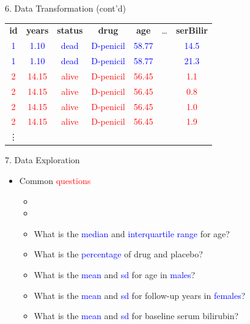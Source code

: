 \documentclass[14pt, aspectratio=169, sectionpage=simple, xclolor=table]{beamer}
\begin{document}
\begin{frame}[fragile]{6. Data Transformation (cont'd)}
\begin{tabular}{ccccccc}
	\textbf{id} &  \textbf{years} &  \textbf{status}  &  \textbf{drug} &  \textbf{age} & \dots &  \textbf{serBilir} \\
	\textcolor{blue}{1}& \textcolor{blue}{1.10} & \textcolor{blue}{dead}&  \textcolor{blue}{ D-penicil} & \textcolor{blue}{58.77} & & \textcolor{blue}{14.5} \\
	\textcolor{blue}{1}& \textcolor{blue}{1.10} & \textcolor{blue}{dead}&  \textcolor{blue}{ D-penicil} & \textcolor{blue}{58.77} & & \textcolor{blue}{21.3} \\
	\textcolor{red}{2}& \textcolor{red}{14.15}& \textcolor{red}{alive}& \textcolor{red}{D-penicil} & \textcolor{red}{56.45} & & \textcolor{red}{1.1}\\
	\textcolor{red}{2}& \textcolor{red}{14.15}& \textcolor{red}{alive}& \textcolor{red}{D-penicil} & \textcolor{red}{56.45} & & \textcolor{red}{0.8}\\
	\textcolor{red}{2}& \textcolor{red}{14.15}& \textcolor{red}{alive}& \textcolor{red}{D-penicil} & \textcolor{red}{56.45} & & \textcolor{red}{1.0}\\
	\textcolor{red}{2}& \textcolor{red}{14.15}& \textcolor{red}{alive}& \textcolor{red}{D-penicil} & \textcolor{red}{56.45} & & \textcolor{red}{1.9}\\
	\vdots &&&&&&
\end{tabular}
\end{frame}
\begin{frame}[fragile]{7. Data Exploration}
\begin{itemize}
\item Common \textcolor{red}{questions}
\vspace{1ex}
\begin{itemize}
	\item {}
	\item {}
  \item What is the \textcolor{blue}{median} and \textcolor{blue}{interquartile range} for age?
 	\item What is the \textcolor{blue}{percentage} of drug and placebo?
	\item What is the \textcolor{blue}{mean} and \textcolor{blue}{sd} for age in \textcolor{blue}{males}?
  \item What is the \textcolor{blue}{mean} and \textcolor{blue}{sd} for follow-up years in \textcolor{blue}{females}?	
	\item What is the \textcolor{blue}{mean} and \textcolor{blue}{sd} for baseline serum bilirubin?
\end{itemize}
\end{itemize}

\end{frame}
\end{document}
